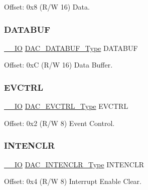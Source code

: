 Offset\+: 0x8 (R/W 16) Data. 

\mbox{\label{struct_dac_a61da94de54928bc3cd8a54ae995d461a}} 
\subsubsection{\texorpdfstring{DATABUF}{DATABUF}}
{\footnotesize\ttfamily \mbox{\hyperlink{core__cm0plus_8h_aec43007d9998a0a0e01faede4133d6be}{\+\_\+\+\_\+\+IO}} \mbox{\hyperlink{union_d_a_c___d_a_t_a_b_u_f___type}{D\+A\+C\+\_\+\+D\+A\+T\+A\+B\+U\+F\+\_\+\+Type}} D\+A\+T\+A\+B\+UF}



Offset\+: 0xC (R/W 16) Data Buffer. 

\mbox{\label{struct_dac_aa6f45347a49f38b08fe4e2b0798acefc}} 
\subsubsection{\texorpdfstring{EVCTRL}{EVCTRL}}
{\footnotesize\ttfamily \mbox{\hyperlink{core__cm0plus_8h_aec43007d9998a0a0e01faede4133d6be}{\+\_\+\+\_\+\+IO}} \mbox{\hyperlink{union_d_a_c___e_v_c_t_r_l___type}{D\+A\+C\+\_\+\+E\+V\+C\+T\+R\+L\+\_\+\+Type}} E\+V\+C\+T\+RL}



Offset\+: 0x2 (R/W 8) Event Control. 

\mbox{\label{struct_dac_a3b4e072f5171822143662fbe6eeb2685}} 
\subsubsection{\texorpdfstring{INTENCLR}{INTENCLR}}
{\footnotesize\ttfamily \mbox{\hyperlink{core__cm0plus_8h_aec43007d9998a0a0e01faede4133d6be}{\+\_\+\+\_\+\+IO}} \mbox{\hyperlink{union_d_a_c___i_n_t_e_n_c_l_r___type}{D\+A\+C\+\_\+\+I\+N\+T\+E\+N\+C\+L\+R\+\_\+\+Type}} I\+N\+T\+E\+N\+C\+LR}



Offset\+: 0x4 (R/W 8) Interrupt Enable Clear. 

\mbox{\label{struct_dac_ae3ccd37e8d31bd0b94cce784de8a3700}} 
